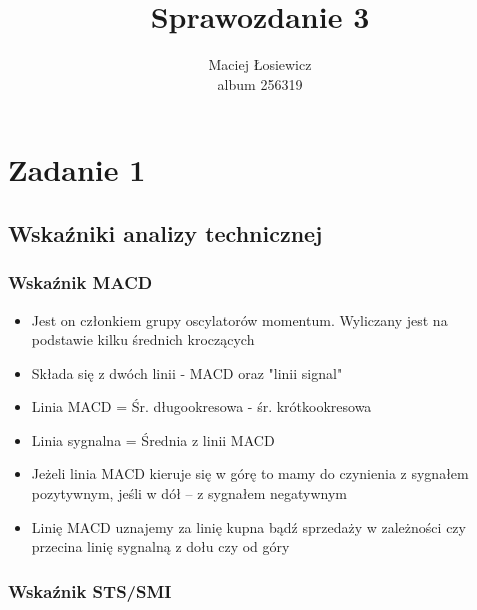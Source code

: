 \documentclass[12pt, a4paper]{article}\usepackage[]{graphicx}\usepackage[]{color}
\begin{document}
\title{Sprawozdanie 3}
\author{Maciej Łosiewicz \\ album 256319}
\maketitle
\tableofcontents


\section{Zadanie 1}
\subsection{Wskaźniki analizy technicznej}
\subsubsection{Wskaźnik MACD}

\begin{itemize}

\item Jest on członkiem grupy oscylatorów momentum. Wyliczany jest na podstawie kilku średnich kroczących

\item Składa się z dwóch linii - MACD oraz "linii signal"

\item Linia MACD = Śr. długookresowa - śr. krótkookresowa

\item Linia sygnalna = Średnia z linii MACD

\item Jeżeli linia MACD kieruje się w górę to mamy do czynienia z sygnałem pozytywnym, jeśli w dół – z sygnałem negatywnym

\item Linię MACD uznajemy za linię kupna bądź sprzedaży w zależności czy przecina linię sygnalną z dołu czy od góry

\end{itemize}


\subsubsection{Wskaźnik STS/SMI}
\end{document}
